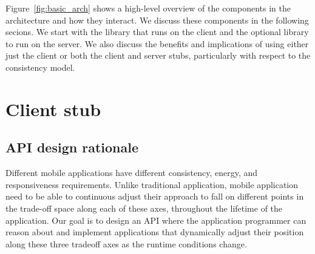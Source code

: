 Figure~\ref{fig:basic_arch} shows a high-level overview of the components in the architecture and how they interact.  We discuss 
these components in the following secions.  We start with the library that runs on the client and the optional library to run
on the server.  We also discuss the benefits and implications of using either just the client or both the client and server
stubs, particularly with respect to the consistency model.


\section{Client stub}

\subsection{API design rationale}
Different mobile applications have different consistency, energy, and responsiveness requirements.  Unlike traditional application, mobile application
need to be able to continuous adjust their approach to fall on different points in the trade-off space along each of these axes,
throughout the lifetime of the application.  Our goal is to design an API where the application programmer can reason about and 
implement applications that dynamically adjust their position along these three tradeoff axes as the runtime conditions change.

